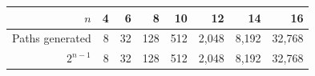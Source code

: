 \begin{tabular}{@{}r rrrrrrr@{}}
\toprule
$n$ & 4 & 6 & 8 & 10 & 12 & 14 & 16\\
\midrule
Paths generated & 8 & 32 & 128 & 512 & 2,048 & 8,192 & 32,768\\
$2^{n-1}$ & 8 & 32 & 128 & 512 & 2,048 & 8,192 & 32,768\\
\bottomrule
\end{tabular}
